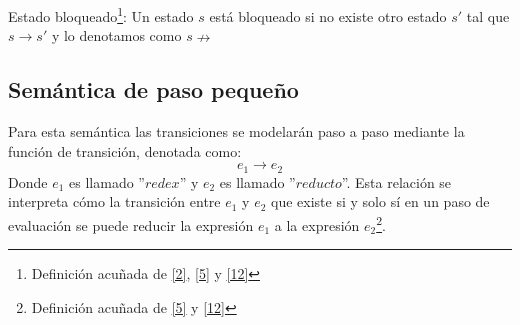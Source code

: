     \begin{definition}Estado bloqueado\footnote{Definición acuñada de \hyperlink{2}{[2]}, \hyperlink{5}{[5]} y  \hyperlink{12}{[12]} }: Un estado $s$ está bloqueado si no existe otro estado $s'$ tal que $s \rightarrow s'$ y lo denotamos como $s \nrightarrow$
    \end{definition}


    \subsection{Semántica de paso pequeño}
        Para esta semántica las transiciones se modelarán paso a paso mediante la función de transición, denotada como: 
	$$e_1 \rightarrow e_2$$ 
	Donde $e_1$ es llamado ''$redex$'' y $e_2$ es llamado ''$reducto$''. Esta relación se interpreta cómo la transición entre $e_1$ y $e_2$ que existe si y solo sí en un paso de evaluación se puede reducir la expresión $e_1$ a la expresión $e_2$\footnote{Definición acuñada de \hyperlink{5}{[5]} y  \hyperlink{12}{[12]} }.


